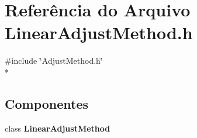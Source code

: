 \section{Referência do Arquivo Linear\+Adjust\+Method.\+h}
\label{_linear_adjust_method_8h}
{\ttfamily \#include \char`\"{}Adjust\+Method.\+h\char`\"{}}\\*
\subsection*{Componentes}
\begin{DoxyCompactItemize}
\item 
class {\bf Linear\+Adjust\+Method}
\end{DoxyCompactItemize}
